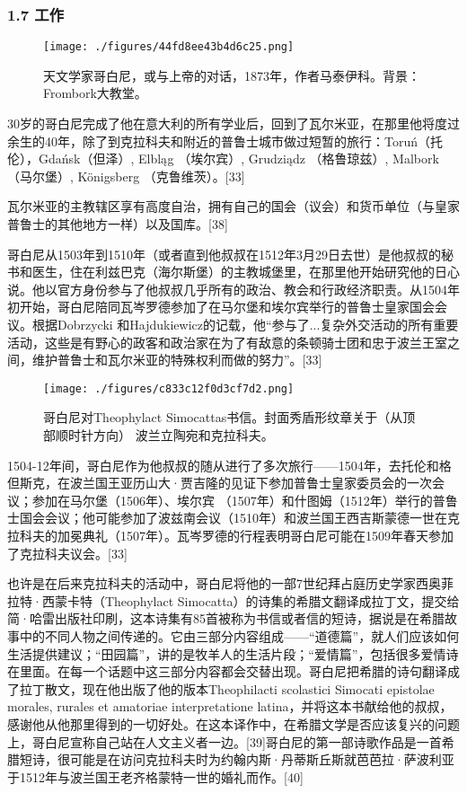 \subsubsection{1.7 工作}
\begin{figure}[ht]
\centering
\texttt{[image: ./figures/44fd8ee43b4d6c25.png]}
\caption{天文学家哥白尼，或与上帝的对话，1873年，作者马泰伊科。背景：Frombork大教堂。} \label{fig_GBN_8}
\end{figure}
30岁的哥白尼完成了他在意大利的所有学业后，回到了瓦尔米亚，在那里他将度过余生的40年，除了到克拉科夫和附近的普鲁士城市做过短暂的旅行：Toruń（托伦），Gdańsk（但泽）, Elbląg （埃尔宾）, Grudziądz （格鲁琼兹）, Malbork （马尔堡）, Königsberg （克鲁维茨）。[33]

瓦尔米亚的主教辖区享有高度自治，拥有自己的国会（议会）和货币单位（与皇家普鲁士的其他地方一样）以及国库。[38]

哥白尼从1503年到1510年（或者直到他叔叔在1512年3月29日去世）是他叔叔的秘书和医生，住在利兹巴克（海尔斯堡）的主教城堡里，在那里他开始研究他的日心说。他以官方身份参与了他叔叔几乎所有的政治、教会和行政经济职责。从1504年初开始，哥白尼陪同瓦岑罗德参加了在马尔堡和埃尔宾举行的普鲁士皇家国会会议。根据Dobrzycki 和Hajdukiewicz的记载，他“参与了...复杂外交活动的所有重要活动，这些是有野心的政客和政治家在为了有敌意的条顿骑士团和忠于波兰王室之间，维护普鲁士和瓦尔米亚的特殊权利而做的努力”。[33]
\begin{figure}[ht]
\centering
\texttt{[image: ./figures/c833c12f0d3cf7d2.png]}
\caption{哥白尼对Theophylact Simocattas书信。封面秀盾形纹章关于（从顶部顺时针方向） 波兰立陶宛和克拉科夫。} \label{fig_GBN_11}
\end{figure}
1504-12年间，哥白尼作为他叔叔的随从进行了多次旅行——1504年，去托伦和格但斯克，在波兰国王亚历山大·贾吉隆的见证下参加普鲁士皇家委员会的一次会议；参加在马尔堡（1506年）、埃尔宾 （1507年）和什图姆（1512年）举行的普鲁士国会会议；他可能参加了波兹南会议（1510年）和波兰国王西吉斯蒙德一世在克拉科夫的加冕典礼（1507年）。瓦岑罗德的行程表明哥白尼可能在1509年春天参加了克拉科夫议会。[33]

也许是在后来克拉科夫的活动中，哥白尼将他的一部7世纪拜占庭历史学家西奥菲拉特·西蒙卡特（Theophylact Simocatta）的诗集的希腊文翻译成拉丁文，提交给简·哈雷出版社印刷，这本诗集有85首被称为书信或者信的短诗，据说是在希腊故事中的不同人物之间传递的。它由三部分内容组成——“道德篇”，就人们应该如何生活提供建议；“田园篇”，讲的是牧羊人的生活片段；“爱情篇”，包括很多爱情诗在里面。在每一个话题中这三部分内容都会交替出现。哥白尼把希腊的诗句翻译成了拉丁散文，现在他出版了他的版本Theophilacti scolastici Simocati epistolae morales, rurales et amatoriae interpretatione latina，并将这本书献给他的叔叔，感谢他从他那里得到的一切好处。在这本译作中，在希腊文学是否应该复兴的问题上，哥白尼宣称自己站在人文主义者一边。[39]哥白尼的第一部诗歌作品是一首希腊短诗，很可能是在访问克拉科夫时为约翰内斯·丹蒂斯丘斯就芭芭拉·萨波利亚于1512年与波兰国王老齐格蒙特一世的婚礼而作。[40]

